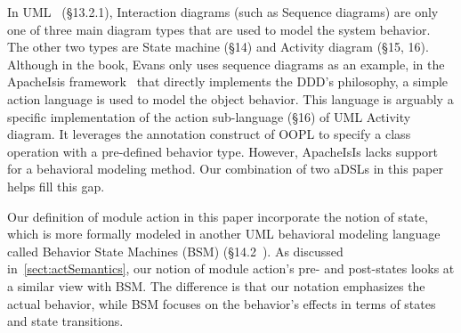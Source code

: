 %
%  

In UML~\cite{omg_unified_2015} (\S{13.2.1}), Interaction diagrams (such as Sequence diagrams) are only one of three main diagram types that are used to model the system behavior. The other two types are State machine (\S{14}) and Activity diagram (\S{15, 16}). Although in the book, Evans only uses sequence diagrams as an example, in the ApacheIsis framework~\cite{dan_haywood_apache_2013} that directly implements the DDD's philosophy, a simple action language is used to model the object behavior. This language is arguably a specific implementation of the action sub-language (\S{16}) of UML Activity diagram. It leverages the annotation construct of OOPL to specify a class operation with a pre-defined behavior type. 
However, ApacheIsIs lacks support for a behavioral modeling method. Our combination of two aDSLs in this paper helps fill this gap.

Our definition of module action in this paper incorporate the notion of state, which is more formally modeled in another UML behavioral modeling language called Behavior State Machines (BSM) (\S{14.2}~\cite{omg_unified_2015}). 
As discussed in~\ref{sect:actSemantics}, our notion of module action's pre- and post-states looks at a similar view with BSM. The difference is that our notation emphasizes the actual behavior, while BSM focuses on the behavior's effects in terms of states and state transitions.

